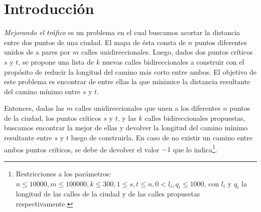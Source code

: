 \section{Introducción}

\textit{Mejorando el tráfico} es un problema en el cual buscamos acortar la distancia entre dos puntos de una ciudad. El mapa de ésta consta de $n$ puntos diferentes unidos de a pares por $m$ calles unidireccionales. Luego, dados dos puntos críticos $s$ y $t$, se propone una lista de $k$ nuevas calles bidireccionales a construir con el propósito de reducir la longitud del camino más corto entre ambos. El objetivo de este problema es encontrar de entre ellas la que minimice la distancia resultante del camino mínimo entre $s$ y $t$.

\vspace{1em}

Entonces, dadas las $m$ calles unidireccionales que unen a los diferentes $n$ puntos de la ciudad, los puntos críticos $s$ y $t$, y las $k$ calles bidireccionales propuestas, buscamos encontrar la mejor de ellas y devolver la longitud del camino mínimo resultante entre $s$ y $t$ luego de construirla. En caso de no existir un camino entre ambos puntos críticos, se debe de devolver el valor $-1$ que lo indica\footnote{Restricciones a los parámetros: \\ \indent \indent $n \leq 10000, m \leq 100000, k \leq 300, 1 \leq s, t \leq n, 0 < l_i, q_i \leq 1000$, con $l_i$ y $q_i$ la longitud de las calles de la ciudad \indent \indent y de las calles propuestas respectivamente.}.

\vspace{1em}

